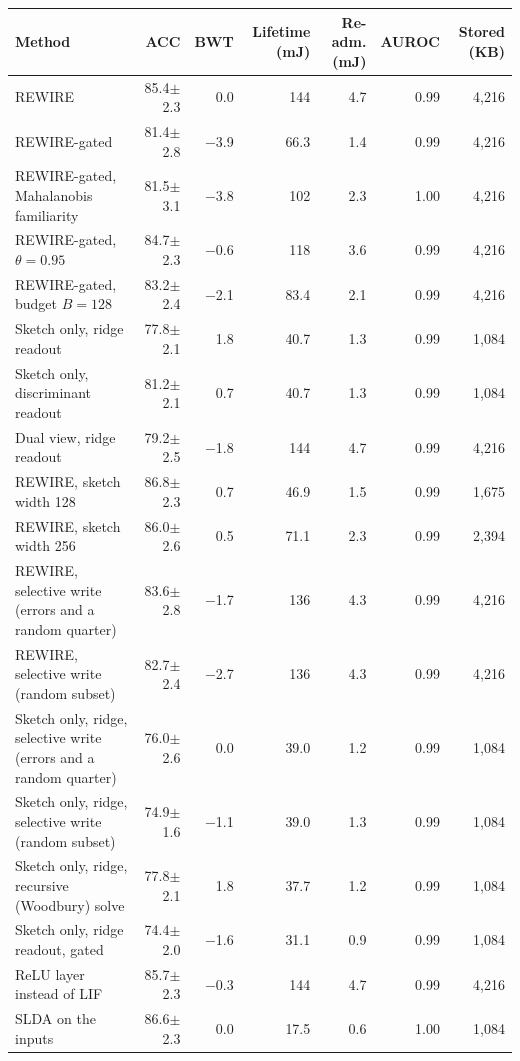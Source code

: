 \begin{tabular*}{\textwidth}{@{\extracolsep{\fill}}lrrrrrr@{}}
\toprule
Method & ACC & BWT & Lifetime (mJ) & Re-adm. (mJ) & AUROC & Stored (KB) \\
\midrule
REWIRE & 85.4$\pm$2.3 & 0.0 & 144 & 4.7 & 0.99 & 4,216 \\
REWIRE-gated & 81.4$\pm$2.8 & \ensuremath{-}3.9 & 66.3 & 1.4 & 0.99 & 4,216 \\
REWIRE-gated, Mahalanobis familiarity & 81.5$\pm$3.1 & \ensuremath{-}3.8 & 102 & 2.3 & 1.00 & 4,216 \\
REWIRE-gated, $\theta=0.95$ & 84.7$\pm$2.3 & \ensuremath{-}0.6 & 118 & 3.6 & 0.99 & 4,216 \\
REWIRE-gated, budget $B=128$ & 83.2$\pm$2.4 & \ensuremath{-}2.1 & 83.4 & 2.1 & 0.99 & 4,216 \\
Sketch only, ridge readout & 77.8$\pm$2.1 & 1.8 & 40.7 & 1.3 & 0.99 & 1,084 \\
Sketch only, discriminant readout & 81.2$\pm$2.1 & 0.7 & 40.7 & 1.3 & 0.99 & 1,084 \\
Dual view, ridge readout & 79.2$\pm$2.5 & \ensuremath{-}1.8 & 144 & 4.7 & 0.99 & 4,216 \\
REWIRE, sketch width 128 & 86.8$\pm$2.3 & 0.7 & 46.9 & 1.5 & 0.99 & 1,675 \\
REWIRE, sketch width 256 & 86.0$\pm$2.6 & 0.5 & 71.1 & 2.3 & 0.99 & 2,394 \\
REWIRE, selective write (errors and a random quarter) & 83.6$\pm$2.8 & \ensuremath{-}1.7 & 136 & 4.3 & 0.99 & 4,216 \\
REWIRE, selective write (random subset) & 82.7$\pm$2.4 & \ensuremath{-}2.7 & 136 & 4.3 & 0.99 & 4,216 \\
Sketch only, ridge, selective write (errors and a random quarter) & 76.0$\pm$2.6 & 0.0 & 39.0 & 1.2 & 0.99 & 1,084 \\
Sketch only, ridge, selective write (random subset) & 74.9$\pm$1.6 & \ensuremath{-}1.1 & 39.0 & 1.3 & 0.99 & 1,084 \\
Sketch only, ridge, recursive (Woodbury) solve & 77.8$\pm$2.1 & 1.8 & 37.7 & 1.2 & 0.99 & 1,084 \\
Sketch only, ridge readout, gated & 74.4$\pm$2.0 & \ensuremath{-}1.6 & 31.1 & 0.9 & 0.99 & 1,084 \\
ReLU layer instead of LIF & 85.7$\pm$2.3 & \ensuremath{-}0.3 & 144 & 4.7 & 0.99 & 4,216 \\
SLDA on the inputs & 86.6$\pm$2.3 & 0.0 & 17.5 & 0.6 & 1.00 & 1,084 \\

\end{tabular*}
